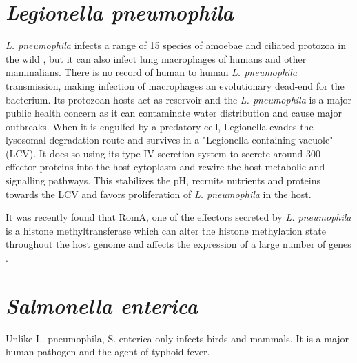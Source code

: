 \section{\textit{Legionella pneumophila}}

\textit{L. pneumophila} infects a range of 15 species of amoebae and ciliated protozoa in the wild \cite{Rowbotham1980}, but it can also infect lung macrophages of humans and other mammalians.
There is no record of human to human \textit{L. pneumophila} transmission, making infection of macrophages an evolutionary dead-end for the bacterium. Its protozoan hosts act as reservoir and the \textit{L. pneumophila} is a major public health concern as it can contaminate water distribution and cause major outbreaks. When it is engulfed by a predatory cell, Legionella evades the lysosomal degradation route and survives in a "Legionella containing vacuole" (LCV). It does so using its type IV secretion system to secrete around 300 effector proteins into the host cytoplasm and rewire the host metabolic and signalling pathways. This stabilizes the pH, recruits nutrients and proteins towards the LCV and favors proliferation of \textit{L. pneumophila} in the host.

It was recently found that RomA, one of the effectors secreted by \textit{L. pneumophila} is a histone methyltransferase which can alter the histone methylation state throughout the host genome and affects the expression of a large number of genes \cite{Rolando2013}.
\section{\textit{Salmonella enterica}}

Unlike {L. pneumophila}, {S. enterica} only infects birds and mammals. It is a major human pathogen and the agent of typhoid fever.
